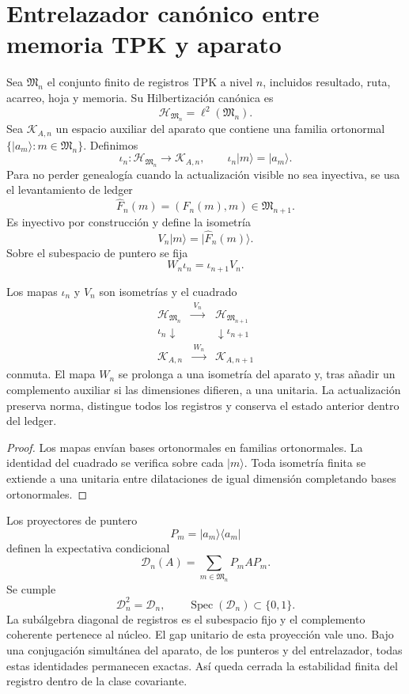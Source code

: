 \section{Entrelazador canónico entre memoria TPK y aparato}
\label{sec:hmtf2-aparato-memoria}

Sea \(\mathfrak M_n\) el conjunto finito de registros TPK a nivel \(n\),
incluidos resultado, ruta, acarreo, hoja y memoria. Su Hilbertización
canónica es
\[
 \mathcal H_{\mathfrak M_n}
 =\ell^2(\mathfrak M_n).
\]
Sea \(\mathcal K_{A,n}\) un espacio auxiliar del aparato que contiene una
familia ortonormal
\(\{|a_m\rangle:m\in\mathfrak M_n\}\). Definimos
\[
 \iota_n:\mathcal H_{\mathfrak M_n}\longrightarrow\mathcal K_{A,n},
 \qquad
 \iota_n|m\rangle=|a_m\rangle.
\]
Para no perder genealogía cuando la actualización visible no sea inyectiva,
se usa el levantamiento de ledger
\[
 \widehat F_n(m)=(F_n(m),m)\in\mathfrak M_{n+1}.
\]
Es inyectivo por construcción y define la isometría
\[
 V_n|m\rangle=|\widehat F_n(m)\rangle.
\]
Sobre el subespacio de puntero se fija
\[
 W_n\iota_n=\iota_{n+1}V_n.
\]

\begin{theorem}
\label{thm:hmtf2-entrelazador-memoria}
Los mapas \(\iota_n\) y \(V_n\) son isometrías y el cuadrado
\[
 \begin{array}{ccc}
 \mathcal H_{\mathfrak M_n}&\xrightarrow{\ V_n\ }&
 \mathcal H_{\mathfrak M_{n+1}}\\
 {\scriptstyle\iota_n}\downarrow&&\downarrow{\scriptstyle\iota_{n+1}}\\
 \mathcal K_{A,n}&\xrightarrow{\ W_n\ }&
 \mathcal K_{A,n+1}
 \end{array}
\]
conmuta. El mapa \(W_n\) se prolonga a una isometría del aparato y, tras
añadir un complemento auxiliar si las dimensiones difieren, a una unitaria.
La actualización preserva norma, distingue todos los registros y conserva el
estado anterior dentro del ledger.
\end{theorem}

\begin{proof}
Los mapas envían bases ortonormales en familias ortonormales. La identidad
del cuadrado se verifica sobre cada \(|m\rangle\). Toda isometría finita se
extiende a una unitaria entre dilataciones de igual dimensión completando
bases ortonormales.
\end{proof}

Los proyectores de puntero
\[
 P_m=|a_m\rangle\langle a_m|
\]
definen la expectativa condicional
\[
 \mathcal D_n(A)=\sum_{m\in\mathfrak M_n}P_m A P_m.
\]
Se cumple
\[
 \mathcal D_n^2=\mathcal D_n,\qquad
 \operatorname{Spec}(\mathcal D_n)\subset\{0,1\}.
\]
La subálgebra diagonal de registros es el subespacio fijo y el complemento
coherente pertenece al núcleo. El gap unitario de esta proyección vale uno.
Bajo una conjugación simultánea del aparato, de los punteros y del
entrelazador, todas estas identidades permanecen exactas. Así queda cerrada
la estabilidad finita del registro dentro de la clase covariante.

